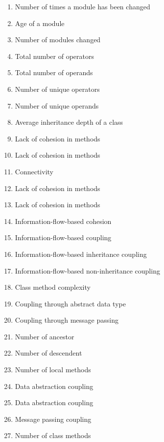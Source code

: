 \documentclass{article}
\begin{document}
{\begin{pptWide}{5}
\begin{enumerate}
\item \textbf{} Number of times a module has been changed
\item \textbf{} Age of a module
\item \textbf{} Number of modules changed
\item \textbf{} Total number of operators
\item \textbf{} Total number of operands
\item \textbf{} Number of unique operators
\item \textbf{} Number of unique operands
\item \textbf{} Average inheritance depth of a class
\item \textbf{} Lack of cohesion in methods
\item \textbf{} Lack of cohesion in methods
\item \textbf{} Connectivity
\item \textbf{} Lack of cohesion in methods
\item \textbf{} Lack of cohesion in methods
\item \textbf{} Information-flow-based cohesion
\item \textbf{} Information-flow-based coupling
\item \textbf{} Information-flow-based inheritance coupling
\item \textbf{} Information-flow-based non-inheritance coupling
\item \textbf{} Class method complexity
\item \textbf{} Coupling through abstract data type
\item \textbf{} Coupling through message passing
\item \textbf{} Number of ancestor
\item \textbf{} Number of descendent
\item \textbf{} Number of local methods
\item \textbf{} Data abstraction coupling
\item \textbf{} Data abstraction coupling
\item \textbf{} Message passing coupling
\item \textbf{} Number of class methods

\end{enumerate}
\end{pptWide}}
\end{document}
